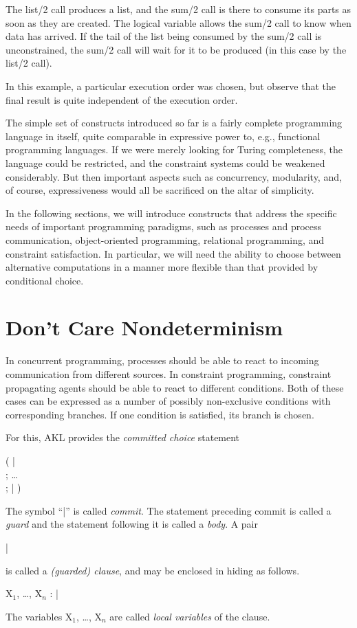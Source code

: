 The {\prog list/2} call produces a list, and the {\prog sum/2} call is
there to consume its parts as soon as they are created.  The logical
variable allows the {\prog sum/2} call to know when data has arrived.
If the tail of the list being consumed by the {\prog sum/2} call is
unconstrained, the {\prog sum/2} call will wait for it to be produced
(in this case by the {\prog list/2} call).

In this example, a particular execution order was chosen, but observe
that the final result is quite independent of the execution order.

The simple set of constructs introduced so far is a fairly complete
programming language in itself, quite comparable in expressive power
to, e.g., functional programming languages.  If we were merely looking
for Turing completeness, the language could be restricted, and the
constraint systems could be weakened considerably.  But then important
aspects such as concurrency, modularity, and, of course,
expressiveness would all be sacrificed on the altar of simplicity.

In the following sections, we will introduce constructs that address
the specific needs of important programming paradigms, such as
processes and process communication, object-oriented programming,
relational programming, and constraint satisfaction.  In particular, we
will need the ability to choose between alternative computations in a
manner more flexible than that provided by conditional choice.

\section{Don't Care Nondeterminism}

In concurrent programming, processes should be able to react to
incoming communication from different sources.  In constraint
programming, constraint propagating agents should be able to react to
different conditions.  Both of these cases can be expressed as a number
of possibly non-exclusive conditions with corresponding branches.  If
one condition is satisfied, its branch is chosen.

For this, AKL provides the {\em committed choice} statement
%
\begin{progex}
(  |  \\
; \dots \\
;  |  )
\end{progex}%
%
The symbol ``{\prog |}'' is called {\em commit}.  The statement
preceding commit is called a {\em guard} and the statement following
it is called a {\em body}.  A pair
%
\begin{progex}
 | 
\end{progex}%
%
is called a {\em (guarded) clause}, and may be enclosed in hiding as
follows.
%
\begin{progex}
X$_1$, \dots, X$_n$ :  | 
\end{progex}%
%
The variables {\prog X$_1$}, \dots, {\prog X$_n$} are called {\em
local variables} of the clause.


